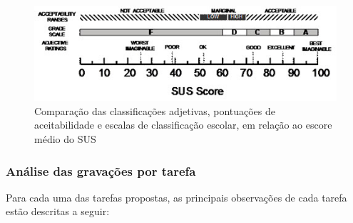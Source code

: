 \begin{figure}[!ht]
  \centering
  \caption{Comparação das classificações adjetivas, pontuações de aceitabilidade e escalas de classificação escolar, em relação ao escore médio do SUS}
  \label{fig:sus_score}
  \includegraphics[scale=1.5]{imagens/sus_score}
\end{figure}

\clearpage
\subsubsection{Análise das gravações por tarefa}
Para cada uma das tarefas propostas, as principais observações de cada tarefa
estão descritas a seguir:

